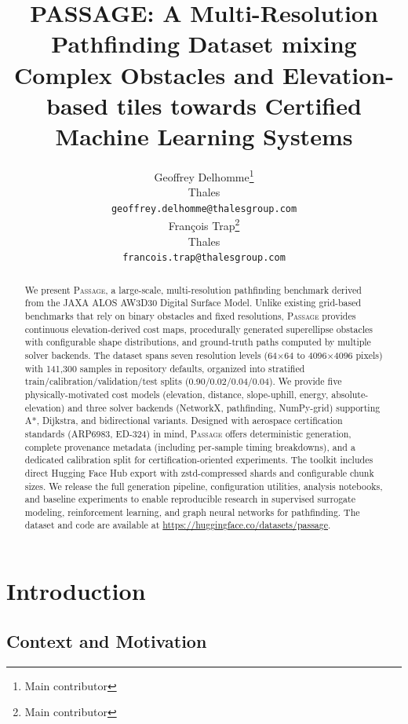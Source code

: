 \documentclass{article}
\title{PASSAGE: A Multi-Resolution Pathfinding Dataset mixing Complex Obstacles and Elevation-based tiles towards Certified Machine Learning Systems}
\author{%
  Geoffrey Delhomme\thanks{Main contributor} \\
  Thales\\
  \texttt{geoffrey.delhomme@thalesgroup.com} \\
  François Trap\thanks{Main contributor}\\
  Thales\\
  \texttt{francois.trap@thalesgroup.com} \\
}
\newcommand{\dataset}{\textsc{Passage}}
\begin{document}
\maketitle

\begin{abstract}
We present \dataset{}, a large-scale, multi-resolution pathfinding benchmark derived from the JAXA ALOS AW3D30 Digital Surface Model. Unlike existing grid-based benchmarks that rely on binary obstacles and fixed resolutions, \dataset{} provides continuous elevation-derived cost maps, procedurally generated superellipse obstacles with configurable shape distributions, and ground-truth paths computed by multiple solver backends. The dataset spans seven resolution levels (64$\times$64 to 4096$\times$4096 pixels) with 141{,}300 samples in repository defaults, organized into stratified train/calibration/validation/test splits (0.90/0.02/0.04/0.04). We provide five physically-motivated cost models (elevation, distance, slope-uphill, energy, absolute-elevation) and three solver backends (NetworkX, pathfinding, NumPy-grid) supporting A*, Dijkstra, and bidirectional variants. Designed with aerospace certification standards (ARP6983, ED-324) in mind, \dataset{} offers deterministic generation, complete provenance metadata (including per-sample timing breakdowns), and a dedicated calibration split for certification-oriented experiments. The toolkit includes direct Hugging Face Hub export with zstd-compressed shards and configurable chunk sizes. We release the full generation pipeline, configuration utilities, analysis notebooks, and baseline experiments to enable reproducible research in supervised surrogate modeling, reinforcement learning, and graph neural networks for pathfinding. The dataset and code are available at \url{https://huggingface.co/datasets/passage}.
\end{abstract}

\section{Introduction}
\label{sec:introduction}

\subsection{Context and Motivation}
\end{document}
